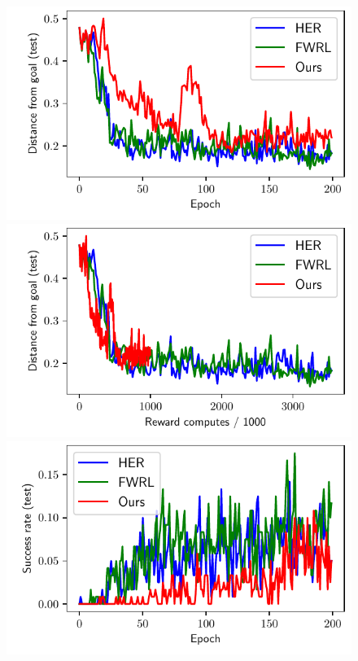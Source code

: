 \begin{figure}
  \includegraphics[width=\frac\columnwidth]{media/res/6efc1de-path_reward_low_thresh_chosen-FetchSlidePR-v1-dqst/epoch-test/ag_g_dist.pdf}
  \includegraphics[width=\frac\columnwidth]{media/res/6efc1de-path_reward_low_thresh_chosen-FetchSlidePR-v1-dqst/reward_computes-test/ag_g_dist.pdf}%
  \includegraphics[width=\frac\columnwidth]{media/res/6efc1de-path_reward_low_thresh_chosen-FetchSlidePR-v1-dqst/epoch-test/success_rate.pdf}%

\end{figure}
